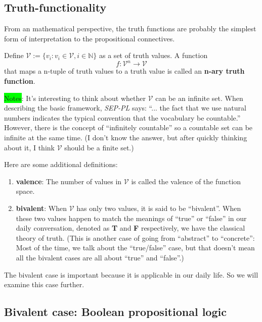 \documentclass[12pt, letterpaper]{article}
\begin{document}
\subsection{Truth-functionality}

From an mathematical perspective, the truth functions are probably the simplest
form of interpretation to the propositional connectives.

Define $\mathcal{V} := \{v_i: v_i \in \mathcal{V}, i \in \mathbb{N}\}$ as a set
of truth values. A function \[f: \mathcal{V}^n \rightarrow \mathcal{V}\] that
maps a n-tuple of truth values to a truth value is called an \textbf{n-ary
  truth function}.

\colorbox{lime}{Notes}: It's interesting to think about whether $\mathcal{V}$
can be an infinite set. When describing the basic framework, \textit{SEP-PL}
says: ``... the fact that we use natural numbers indicates the typical
convention that the vocabulary be countable.'' However, there is the concept of
``infinitely countable'' so a countable set can be infinite at the same time.
(I don't know the answer, but after quickly thinking about it, I think
$\mathcal{V}$ should be a finite set.)

Here are some additional definitions:
\begin{enumerate}
  \item \textbf{valence}: The number of values in $\mathcal{V}$ is called the
        valence of the function space.
  \item \textbf{bivalent}: When $\mathcal{V}$ has only two values, it is said
        to be ``bivalent''. When these two values happen to match the meanings of
        ``true'' or ``false'' in our daily conversation, denoted as \textbf{T} and
        \textbf{F} respectively, we have the classical theory of truth. (This is
        another case of going from ``abstract'' to ``concrete'': Most of the time,
        we talk about the ``true/false'' case, but that doesn't mean all the
        bivalent cases are all about ``true'' and ``false''.)
\end{enumerate}

The bivalent case is important because it is applicable in our daily life. So
we will examine this case further.

\subsection{Bivalent case: Boolean propositional logic}
\end{document}
